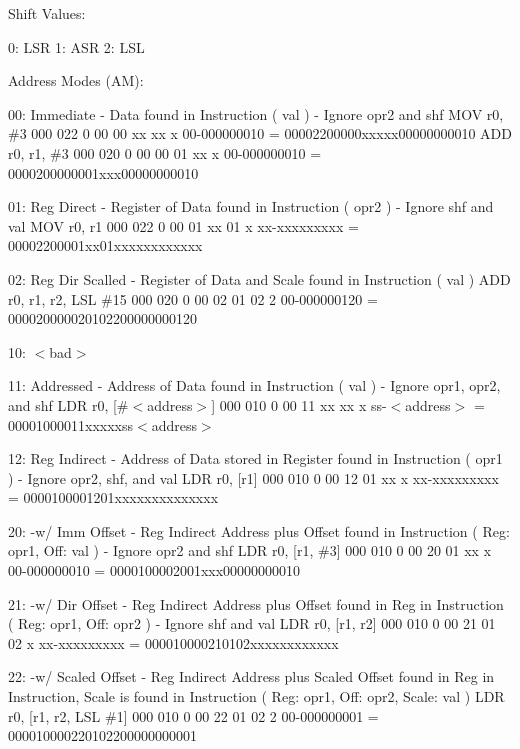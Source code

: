 \documentclass[12pt]{article}
\begin{document}
Shift Values:

    0: LSR
    1: ASR
    2: LSL
        
Address Modes (AM):
    
    00:     Immediate -         Data found in Instruction ( val ) - Ignore opr2 and shf
        MOV     r0, $\#$3          000 022 0 00 00 xx xx x 00-000000010 = 00002200000xxxxx00000000010
        ADD     r0, r1, $\#$3      000 020 0 00 00 01 xx x 00-000000010 = 0000200000001xxx00000000010
        
    01:     Reg Direct -        Register of Data found in Instruction ( opr2 ) - Ignore shf and val
        MOV     r0, r1          000 022 0 00 01 xx 01 x xx-xxxxxxxxx = 00002200001xx01xxxxxxxxxxxx
        
    02:     Reg Dir Scalled -   Register of Data and Scale found in Instruction ( val )
        ADD     r0, r1, r2, LSL $\#$15
                                000 020 0 00 02 01 02 2 00-000000120 = 000020000020102200000000120
    
    10:     $<$bad$>$
        
    11:     Addressed -         Address of Data found in Instruction ( val ) - Ignore opr1, opr2, and shf
        LDR     r0, [$\#$$<$address$>$]
                                000 010 0 00 11 xx xx x ss-$<$address$>$ = 00001000011xxxxxss$<$address$>$
        
    12:     Reg Indirect -      Address of Data stored in Register found in Instruction ( opr1 ) - Ignore opr2, shf, and val
        LDR     r0, [r1]        000 010 0 00 12 01 xx x xx-xxxxxxxxx = 0000100001201xxxxxxxxxxxxxx
        
    20:     -w/ Imm Offset -    Reg Indirect Address plus Offset found in Instruction ( Reg: opr1, Off: val ) - Ignore opr2 and shf
        LDR     r0, [r1, $\#$3]    000 010 0 00 20 01 xx x 00-000000010 = 0000100002001xxx00000000010
        
    21:     -w/ Dir Offset -    Reg Indirect Address plus Offset found in Reg in Instruction ( Reg: opr1, Off: opr2 ) - Ignore shf and val
        LDR     r0, [r1, r2]    000 010 0 00 21 01 02 x xx-xxxxxxxxx = 000010000210102xxxxxxxxxxxx
                                
    22:     -w/ Scaled Offset - Reg Indirect Address plus Scaled Offset found in Reg in Instruction, Scale is found in Instruction
                                ( Reg: opr1, Off: opr2, Scale: val )
        LDR     r0, [r1, r2, LSL $\#$1]
                                000 010 0 00 22 01 02 2 00-000000001 = 000010000220102200000000001
    
\end{document}

